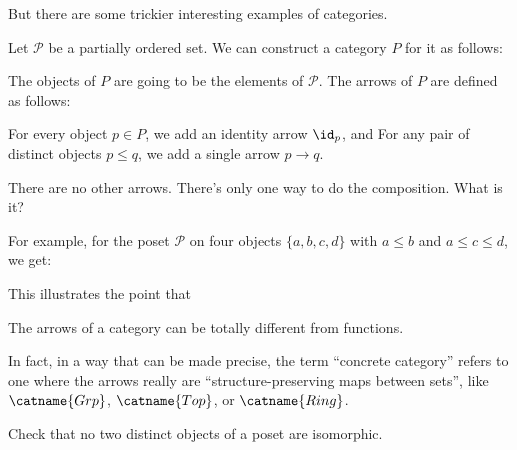 But there are some trickier interesting examples of categories.
\begin{example}
	Let $\mathcal P$ be a partially ordered set.
	We can construct a category $P$ for it as follows:
	\begin{itemize}
		\ii The objects of $P$ are going to be the elements of $\mathcal P$.
		\ii The arrows of $P$ are defined as follows:
		\begin{itemize}
			\ii For every object $p \in P$, we add an identity arrow $\id_p$, and
			\ii For any pair of distinct objects $p \le q$, we add a single arrow $p \to q$.
		\end{itemize}
		There are no other arrows.
		\ii There's only one way to do the composition. What is it?
	\end{itemize}
\end{example}
For example, for the poset $\mathcal P$ on four objects $\{a,b,c,d\}$ with $a \le b$ and $a \le c \le d$, we get:
\begin{center}
\end{center}

This illustrates the point that
\begin{moral}
	The arrows of a category can be totally different from functions.
\end{moral}
In fact, in a way that can be made precise, the term ``concrete category'' refers
to one where the arrows really are ``structure-preserving maps between sets'',
like $\catname{Grp}$, $\catname{Top}$, or $\catname{Ring}$.

\begin{ques}
	Check that no two distinct objects of a poset are isomorphic.
\end{ques}

